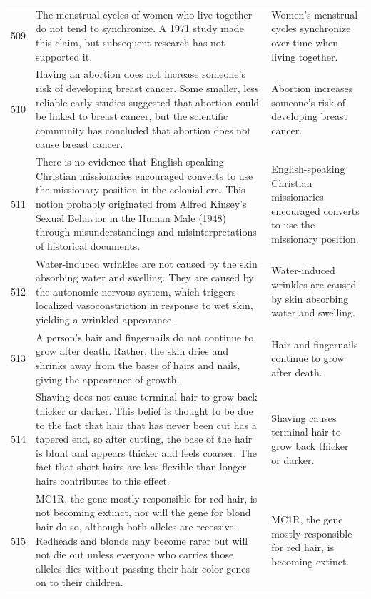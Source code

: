 \begin{tabular}{c|p{}|p{}}
509 & The menstrual cycles of women who live together do not tend to synchronize. A 1971 study made this claim, but subsequent research has not supported it. & Women's menstrual cycles synchronize over time when living together. \\
510 & Having an abortion does not increase someone's risk of developing breast cancer. Some smaller, less reliable early studies suggested that abortion could be linked to breast cancer, but the scientific community has concluded that abortion does not cause breast cancer. & Abortion increases someone's risk of developing breast cancer. \\
511 & There is no evidence that English-speaking Christian missionaries encouraged converts to use the missionary position in the colonial era. This notion probably originated from Alfred Kinsey's Sexual Behavior in the Human Male (1948) through misunderstandings and misinterpretations of historical documents. & English-speaking Christian missionaries encouraged converts to use the missionary position. \\
512 & Water-induced wrinkles are not caused by the skin absorbing water and swelling. They are caused by the autonomic nervous system, which triggers localized vasoconstriction in response to wet skin, yielding a wrinkled appearance. & Water-induced wrinkles are caused by skin absorbing water and swelling. \\
513 & A person's hair and fingernails do not continue to grow after death. Rather, the skin dries and shrinks away from the bases of hairs and nails, giving the appearance of growth. & Hair and fingernails continue to grow after death. \\
514 & Shaving does not cause terminal hair to grow back thicker or darker. This belief is thought to be due to the fact that hair that has never been cut has a tapered end, so after cutting, the base of the hair is blunt and appears thicker and feels coarser. The fact that short hairs are less flexible than longer hairs contributes to this effect. & Shaving causes terminal hair to grow back thicker or darker. \\
515 & MC1R, the gene mostly responsible for red hair, is not becoming extinct, nor will the gene for blond hair do so, although both alleles are recessive. Redheads and blonds may become rarer but will not die out unless everyone who carries those alleles dies without passing their hair color genes on to their children. & MC1R, the gene mostly responsible for red hair, is becoming extinct. \\

\end{tabular}
